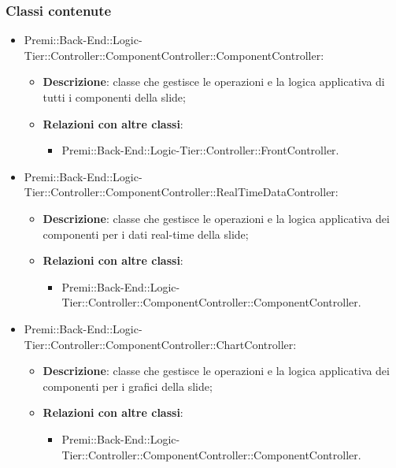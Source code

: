	\subsubsection*{Classi contenute}
	\begin{itemize}
		\item Premi::Back-End::Logic-Tier::Controller::ComponentController::ComponentController:
		\begin{itemize}
			\item \textbf{Descrizione}: classe che gestisce le operazioni e la logica applicativa di tutti i componenti della \gls{slide};
			\item \textbf{Relazioni con altre classi}:
			\begin{itemize}
				\item Premi::Back-End::Logic-Tier::Controller::FrontController.
			\end{itemize}
		\end{itemize}
		
		\item Premi::Back-End::Logic-Tier::Controller::ComponentController::RealTimeDataController:
		\begin{itemize}
			\item \textbf{Descrizione}: classe che gestisce le operazioni e la logica applicativa dei componenti per i dati real-time della \gls{slide};
			\item \textbf{Relazioni con altre classi}:
			\begin{itemize}
				\item Premi::Back-End::Logic-Tier::Controller::ComponentController::ComponentController.
			\end{itemize}
		\end{itemize}
		
		\item Premi::Back-End::Logic-Tier::Controller::ComponentController::ChartController:
		\begin{itemize}
			\item \textbf{Descrizione}: classe che gestisce le operazioni e la logica applicativa dei componenti per i grafici della \gls{slide};
			\item \textbf{Relazioni con altre classi}:
			\begin{itemize}
				\item Premi::Back-End::Logic-Tier::Controller::ComponentController::ComponentController.
			\end{itemize}
		\end{itemize}
		

\end{itemize}
